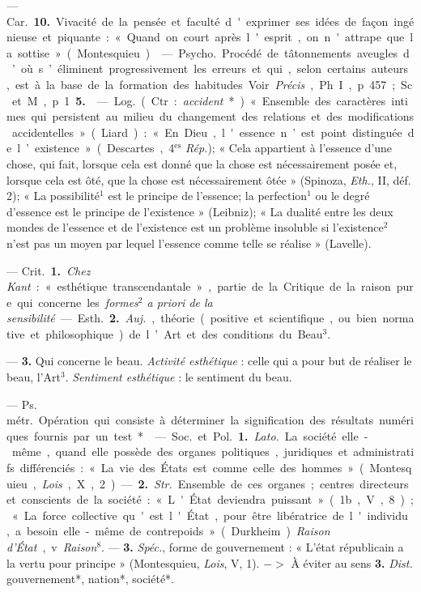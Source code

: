\begin{itemize}[leftmargin=1cm, label=, itemsep=1pt]
— \si{Car.} {\bf 10.} Vivacité de la pensée
et faculté d'exprimer ses idées de
façon ingénieuse et piquante :
« Quand on court après l'esprit, on
n'attrape que la sottise » (Montesquieu).

 — \si{Psycho.} Procédé
de tâtonnements aveugles d’où s’éliminent progressivement les erreurs
et qui, selon certains auteurs, est à
la base de la formation des habitudes. Voir  {\it Précis}, Ph. I, p. 457; Sc.
et M., p. 1 {\bf 5.}

 — \si{Log.} (Ctr. : {\it accident}*).
« Ensemble des caractères intimes
qui persistent au milieu du changement des relations et des
modifications accidentelles » (Liard) : « En
Dieu, l'essence n’est point distinguée
de l’existence » (Descartes, 4$^\text{es}$ {\it Rép.});
« Cela appartient à l’essence d’une
chose, qui fait, lorsque cela est donné
que la chose est nécessairement
posée et, lorsque cela est ôté, que la
chose est nécessairement ôtée »
(Spinoza, {\it Eth.}, II, déf. 2); « La
possibilité$^1$ est le principe de l’essence; la perfection$^1$ ou le degré
d'essence est le principe de l'existence » (Leibniz); « La dualité entre
les deux mondes de l'essence et de
l'existence est un problème insoluble si l'existence$^2$ n’est pas un
moyen par lequel l'essence comme
telle se réalise » (Lavelle).

 — \si{Crit.} {\bf 1.} {\it Chez
Kant} : « esthétique transcendantale », partie de la Critique de la
raison pure qui concerne les {\it formes$^2$
a priori de la sensibilité}.

— \si{Esth.} {\bf 2.} {\it Auj.}, théorie (positive et scientifique, ou bien normative et philosophique) de l’Art et
des conditions du Beau$^3$.

 — {\bf 3.} Qui concerne
le beau. {\it Activité esthétique} : celle qui
a pour but de réaliser le beau, l’Art$^3$.
{\it Sentiment esthétique} : le sentiment du beau.

 — \si{Ps. métr.} Opération
qui consiste à déterminer la signification des résultats numériques
fournis par un test*.

 — \si{Soc.} et \si{Pol.} {\bf 1.} {\it Lato.} La société
elle-même, quand elle possède des
organes politiques, juridiques et
administratifs différenciés : « La vie
des États est comme celle des hommes » (Montesquieu, {\it Lois}, X, 2). —
 {\bf 2.} {\it Str.} Ensemble de ces organes;
centres directeurs et conscients de
la société : « L'État deviendra puissant »
(1b., V, 8); « La force collective qu'est l'État, pour être libératrice
de l'individu, a besoin elle-même de contrepoids » (Durkheim).
{\it Raison d'État}, v. {\it Raison}$^8$. — {\bf 3.}
{\it Spéc.}, forme de gouvernement :
« L'état républicain a la vertu pour
principe » (Montesquieu, {\it Lois}, V, 1).
$->$ À éviter au sens {\bf 3.} {\it Dist.} gouvernement*, nation*, société*.


\end{itemize}
